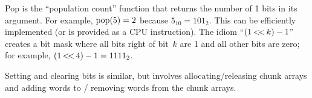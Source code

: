 Pop is the ``population count'' function that returns the number
of 1 bits in its argument. For example, $\mathord{\rm pop}(5)=2$ because $5_{10}=101_2$.
This can be efficiently implemented (or is provided as a CPU instruction).
The idiom ``$(1\mathop{<\!<} k)-1$'' creates a bit mask where all bits right of
bit~$k$ are 1 and all other bits are zero; for example, $(1\mathop{<\!<}4)-1=1111_2$.

\medskip\noindent
Setting and clearing bits is similar, but involves allocating/releasing
chunk arrays and adding words to / removing words from the chunk arrays.

\bye

